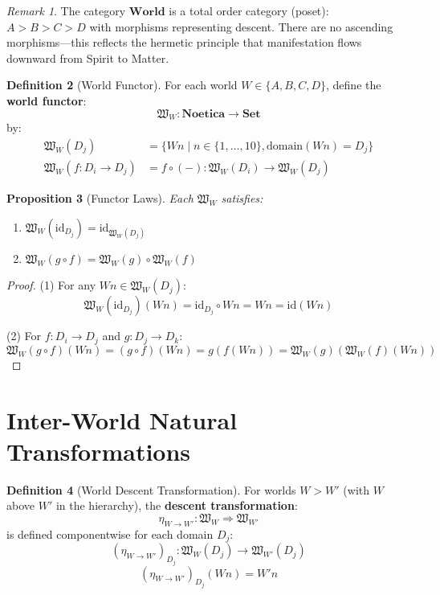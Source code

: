 \documentclass[11pt,twoside,openright]{book}
\theoremstyle{definition}
\newtheorem{definition}{Definition}[chapter]
\theoremstyle{plain}
\newtheorem{proposition}[definition]{Proposition}
\theoremstyle{remark}
\newtheorem{remark}[definition]{Remark}
\newcommand{\Noetica}{\mathbf{Noetica}}
\newcommand{\NatTrans}[2]{\eta_{#1 \to #2}}
\newcommand{\WorldFunctor}[1]{\mathfrak{W}_{#1}}
\begin{document}
\begin{remark}
The category $\mathbf{World}$ is a total order category (poset): $A > B > C > D$ with morphisms representing descent. There are no ascending morphisms—this reflects the hermetic principle that manifestation flows downward from Spirit to Matter.
\end{remark}

\begin{definition}[World Functor]
\label{def:world-functor}
For each world $W \in \{A, B, C, D\}$, define the \textbf{world functor}:
\[
\WorldFunctor{W} : \Noetica \to \mathbf{Set}
\]
by:
\begin{align}
\WorldFunctor{W}(D_j) &= \{Wn \mid n \in \{1, \ldots, 10\}, \mathrm{domain}(Wn) = D_j\} \\
\WorldFunctor{W}(f: D_i \to D_j) &= f \circ (-) : \WorldFunctor{W}(D_i) \to \WorldFunctor{W}(D_j)
\end{align}
\end{definition}

\begin{proposition}[Functor Laws]
\label{prop:world-functor-laws}
Each $\WorldFunctor{W}$ satisfies:
\begin{enumerate}
  \item $\WorldFunctor{W}(\mathrm{id}_{D_j}) = \mathrm{id}_{\WorldFunctor{W}(D_j)}$
  \item $\WorldFunctor{W}(g \circ f) = \WorldFunctor{W}(g) \circ \WorldFunctor{W}(f)$
\end{enumerate}
\end{proposition}

\begin{proof}
(1) For any $Wn \in \WorldFunctor{W}(D_j)$:
\[
\WorldFunctor{W}(\mathrm{id}_{D_j})(Wn) = \mathrm{id}_{D_j} \circ Wn = Wn = \mathrm{id}(Wn)
\]

(2) For $f: D_i \to D_j$ and $g: D_j \to D_k$:
\[
\WorldFunctor{W}(g \circ f)(Wn) = (g \circ f)(Wn) = g(f(Wn)) = \WorldFunctor{W}(g)(\WorldFunctor{W}(f)(Wn))
\]
\end{proof}

\section{Inter-World Natural Transformations}

\begin{definition}[World Descent Transformation]
\label{def:descent-trans}
For worlds $W > W'$ (with $W$ above $W'$ in the hierarchy), the \textbf{descent transformation}:
\[
\NatTrans{W}{W'} : \WorldFunctor{W} \Rightarrow \WorldFunctor{W'}
\]
is defined componentwise for each domain $D_j$:
\[
(\NatTrans{W}{W'})_{D_j} : \WorldFunctor{W}(D_j) \to \WorldFunctor{W'}(D_j)
\]
\[
(\NatTrans{W}{W'})_{D_j}(Wn) = W'n
\]
\end{definition}
\end{document}

